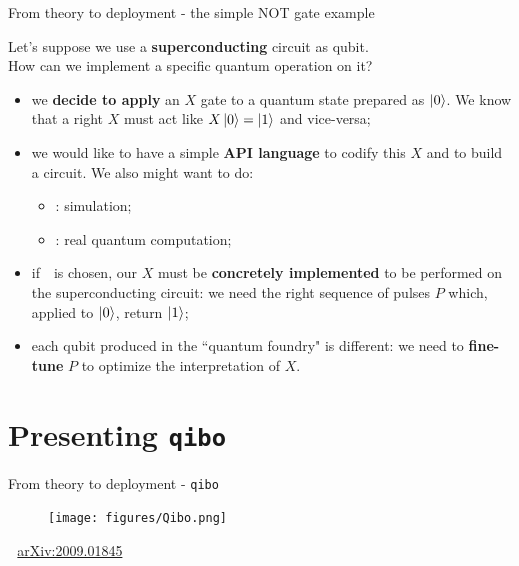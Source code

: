 \documentclass[8pt, xcolor={svgnames}, hyperref={colorlinks,linkcolor=black, citecolor=amethyst, urlcolor=amethyst}]{beamer}
\begin{document}
\begin{frame}{From theory to deployment - the simple NOT gate example}

\large

Let's suppose we use a \textbf{superconducting} circuit as qubit. \\ How can we implement a specific quantum operation on it?
\pause
\vspace{0.3cm}

\begin{itemize}
    \item[\faPencilSquareO] we \textbf{decide to apply} an $X$ gate to a quantum state prepared as $\ket{0}$. We know that a right $X$ must act like $X\ket{0}=\ket{1}$ and vice-versa;
    \pause
    \item[\faTerminal] we would like to have a simple \textbf{API language} to codify this $X$ and  to build a circuit. We also might want to do:
    \begin{itemize}
        \item[\faCode]: simulation;
        \item[\faCog]: real quantum computation; 
    \end{itemize}
    \pause
    \item[\faCogs] if \faCog\,\, is chosen, our $X$ must be \textbf{concretely implemented} to be performed on the superconducting circuit: we need the right sequence of pulses $P$ which, applied to $\ket{0}$, return $\ket{1}$;
    \pause
    \item[\faSliders] each qubit produced in the ``quantum foundry" is different: we need to \textbf{fine-tune} $P$ to optimize the interpretation of $X$.
\end{itemize}
    
\end{frame}

\section{Presenting \texttt{qibo}}

\begin{frame}{From theory to deployment - \texttt{qibo}}
\large
    \begin{figure}
    \centering 
    \texttt{[image: figures/Qibo.png]}
  \end{figure}
  \faBook\,\, \href{https://arxiv.org/abs/2009.01845}{arXiv:2009.01845}
\end{frame}
\end{document}
